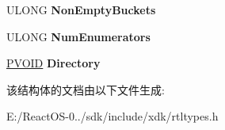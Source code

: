 \begin{DoxyCompactItemize}
U\+L\+O\+NG {\bfseries Non\+Empty\+Buckets}
\item 
\mbox{\label{struct___r_t_l___d_y_n_a_m_i_c___h_a_s_h___t_a_b_l_e_a77bed79f70b96e5a09181da05f14920f}} 
U\+L\+O\+NG {\bfseries Num\+Enumerators}
\item 
\mbox{\label{struct___r_t_l___d_y_n_a_m_i_c___h_a_s_h___t_a_b_l_e_a54e248a0fc2c3ec745becd3bc1715142}} 
\hyperlink{interfacevoid}{P\+V\+O\+ID} {\bfseries Directory}
\end{DoxyCompactItemize}


该结构体的文档由以下文件生成\+:\begin{DoxyCompactItemize}
\item 
E\+:/\+React\+O\+S-\/0../sdk/include/xdk/rtltypes.\+h\end{DoxyCompactItemize}
